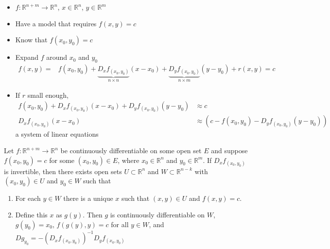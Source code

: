 \documentclass[compress]{beamer}
\def\R{\mathbb{R}}
\renewcommand{\to}{{\rightarrow}}
\begin{document}
\begin{frame}
  \begin{itemize}
  \item $f:\R^{n+m} \to \R^{n}$, $x \in \R^n$, $y \in \R^m$
  \item Have a model that requires $f(x,y) = c$
  \item Know that $f(x_0,y_0) = c$
  \item Expand $f$ around $x_0$ and $y_0$
    \begin{align*}
      f(x,y) = & f(x_0,y_0) + \underbrace{D_x
      f_{(x_0,y_0)}}_{n \times n} (x-x_0) + 
      \underbrace{D_y f_{(x_0,y_0)}}_{n \times m} 
      (y-y_0) + r(x,y) = c 
    \end{align*}
  \item If $r$ small enough, 
    \begin{align*}
      f(x_0,y_0) + D_xf_{(x_0,y_0)} (x-x_0) + D_yf_{(x_0,y_0)}
      (y-y_0) & \approx c \\
      D_xf_{(x_0,y_0)} (x-x_0) & \approx \left(c -  f(x_0,y_0) -
        D_yf_{(x_0,y_0)} (y-y_0)\right) 
    \end{align*}
    a system of linear equations
  \end{itemize}
\end{frame}

\begin{frame}
  \begin{theorem}\label{thm:implicit}
    Let $f:\R^{n+m} \to \R^n$ be continuously differentiable on some open
    set $E$ and suppose $f(x_0,y_0) = c$ for some $(x_0,y_0) \in E$,
    where $x_0 \in \R^n$ and $y_0 \in \R^m$. If 
    $D_xf_{(x_0,y_0)}$ is invertible, then there exists open sets $U
    \subset \R^n$ and $W \subset \R^{n-k}$ with $(x_0,y_0) \in U$ and
    $y_0 \in W$ such that 
    \begin{enumerate}
    \item\label{imp1} 
      For each $y\in W$ there is a unique $x$ such that $(x,y) \in
      U$ and $f(x,y) = c$.
    \item\label{imp2}
      Define this $x$ as $g(y)$. Then $g$ is continuously
      differentiable on $W$, $g(y_0) = x_0$,
      $f(g(y),y) = c$ for all $y
      \in W$, and $Dg_{y_0} = -\left(D_xf_{(x_0,y_0)}\right)^{-1}
      D_yf_{(x_0,y_0)}$ 
    \end{enumerate}
  \end{theorem}
\end{frame}

\end{document}
